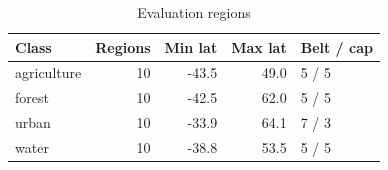 \begin{table}[t]
\centering
\caption{Evaluation regions}
\label{tab:benchmark_scenes}
\footnotesize
\setlength{\tabcolsep}{3pt}
\begin{tabular}{lrrrl}
\toprule
Class & Regions & Min lat & Max lat & Belt / cap \\
\midrule
agriculture & 10 & -43.5 & 49.0 & 5 / 5 \\
forest & 10 & -42.5 & 62.0 & 5 / 5 \\
urban & 10 & -33.9 & 64.1 & 7 / 3 \\
water & 10 & -38.8 & 53.5 & 5 / 5 \\
\bottomrule
\end{tabular}
\end{table}
